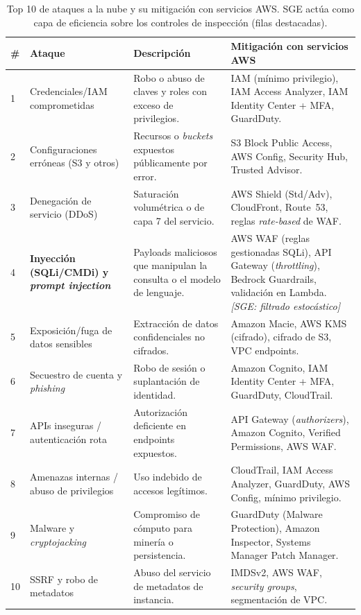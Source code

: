 \documentclass[10pt,twocolumn]{article}
\begin{document}
\begin{table}[t]
\centering
\small
\caption{Top 10 de ataques a la nube y su mitigaci\'on con servicios AWS. SGE act\'ua
como capa de eficiencia sobre los controles de inspecci\'on (filas destacadas).}
\label{tab:top10}
\renewcommand{\arraystretch}{1.25}
\begin{tabular}{@{}p{0.5cm} p{3.6cm} p{5.3cm} p{6.2cm}@{}}
\toprule
\textbf{\#} & \textbf{Ataque} & \textbf{Descripci\'on} & \textbf{Mitigaci\'on con servicios AWS} \\
\midrule
1 & Credenciales/IAM comprometidas & Robo o abuso de claves y roles con exceso de privilegios. & IAM (m\'inimo privilegio), IAM Access Analyzer, IAM Identity Center + MFA, GuardDuty. \\
2 & Configuraciones err\'oneas (S3 y otros) & Recursos o \emph{buckets} expuestos p\'ublicamente por error. & S3 Block Public Access, AWS Config, Security Hub, Trusted Advisor. \\
3 & Denegaci\'on de servicio (DDoS) & Saturaci\'on volum\'etrica o de capa 7 del servicio. & AWS Shield (Std/Adv), CloudFront, Route~53, reglas \emph{rate-based} de WAF. \\
\rowcolor{green!8}
4 & \textbf{Inyecci\'on (SQLi/CMDi) y \emph{prompt injection}} & Payloads maliciosos que manipulan la consulta o el modelo de lenguaje. & AWS WAF (reglas gestionadas SQLi), API Gateway (\emph{throttling}), Bedrock Guardrails, validaci\'on en Lambda. \emph{[SGE: filtrado estoc\'astico]} \\
5 & Exposici\'on/fuga de datos sensibles & Extracci\'on de datos confidenciales no cifrados. & Amazon Macie, AWS KMS (cifrado), cifrado de S3, VPC endpoints. \\
6 & Secuestro de cuenta y \emph{phishing} & Robo de sesi\'on o suplantaci\'on de identidad. & Amazon Cognito, IAM Identity Center + MFA, GuardDuty, CloudTrail. \\
7 & APIs inseguras / autenticaci\'on rota & Autorizaci\'on deficiente en endpoints expuestos. & API Gateway (\emph{authorizers}), Amazon Cognito, Verified Permissions, AWS WAF. \\
8 & Amenazas internas / abuso de privilegios & Uso indebido de accesos leg\'itimos. & CloudTrail, IAM Access Analyzer, GuardDuty, AWS Config, m\'inimo privilegio. \\
9 & Malware y \emph{cryptojacking} & Compromiso de c\'omputo para miner\'ia o persistencia. & GuardDuty (Malware Protection), Amazon Inspector, Systems Manager Patch Manager. \\
10 & SSRF y robo de metadatos & Abuso del servicio de metadatos de instancia. & IMDSv2, AWS WAF, \emph{security groups}, segmentaci\'on de VPC. \\
\bottomrule
\end{tabular}
\end{table}
\end{document}
